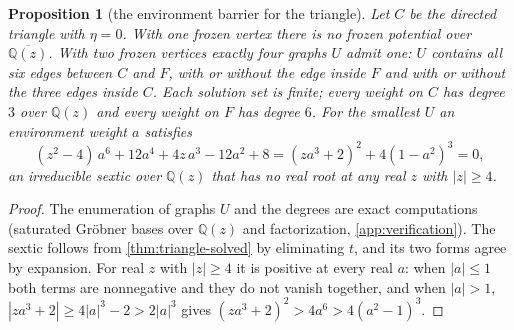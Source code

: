 \documentclass[11pt]{amsart}
\theoremstyle{plain}
\newtheorem{proposition}[theorem]{Proposition}
\theoremstyle{definition}
\theoremstyle{remark}
\numberwithin{equation}{section}
\newcommand{\QQ}{\mathbb{Q}}
\newcommand{\Qz}{\QQ(z)}
\newcommand{\Qzbar}{\overline{\QQ(z)}}
\begin{document}
\begin{proposition}[the environment barrier for the triangle]\label{prop:env-barrier}
Let $C$ be the directed triangle with $\eta=0$. With one frozen vertex there is no frozen potential over $\Qzbar$. With two frozen vertices exactly four graphs $U$ admit one: $U$ contains all six edges between $C$ and $F$, with or without the edge inside $F$ and with or without the three edges inside $C$. Each solution set is finite; every weight on $C$ has degree $3$ over $\Qz$ and every weight on $F$ has degree $6$. For the smallest $U$ an environment weight $a$ satisfies
\[
(z^{2}-4)\,a^{6}+12a^{4}+4z\,a^{3}-12a^{2}+8=(za^{3}+2)^{2}+4(1-a^{2})^{3}=0,
\]
an irreducible sextic over $\Qz$ that has no real root at any real $z$ with $|z|\ge4$.
\end{proposition}
\begin{proof}
The enumeration of graphs $U$ and the degrees are exact computations (saturated Gr\"obner bases over $\Qz$ and factorization, \cref{app:verification}). The sextic follows from \cref{thm:triangle-solved} by eliminating $t$, and its two forms agree by expansion. For real $z$ with $|z|\ge4$ it is positive at every real $a$: when $|a|\le1$ both terms are nonnegative and they do not vanish together, and when $|a|>1$, $|za^{3}+2|\ge4|a|^3-2>2|a|^{3}$ gives $(za^{3}+2)^{2}>4a^{6}>4(a^{2}-1)^{3}$.
\end{proof}
\end{document}
